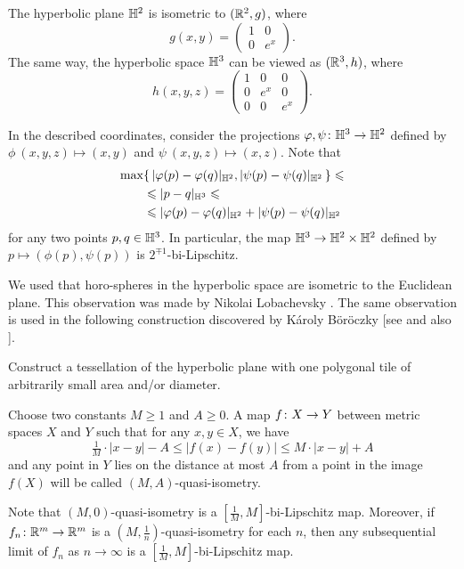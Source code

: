 The hyperbolic plane $\mathbb{H}^2$ is isometric to $(\mathbb{R}^2,g)$, where 
\[g(x,y)=\left(\begin{matrix}
     1&0
     \\
     0&e^{x}
    \end{matrix}\right).\]
The same way, the hyperbolic space $\mathbb{H}^3$
can be viewed as $(\mathbb{R}^3,h)$, where 
\[h(x,y,z)=\left(\begin{matrix}
     1&0&0
     \\
     0&e^{x}&0
     \\
     0&0&e^{x}
\end{matrix}\right).\]
    
In the described coordinates, consider the projections $\varphi,\psi\colon\mathbb{H}^3\to\mathbb{H}^2$ defined by 
$\phi\:(x,y,z)\mapsto (x,y)$ and $\psi\:(x,y,z)\mapsto (x,z)$.
Note that 
\begin{align*}
\max&\{\,|\varphi(p)-\varphi(q)|_{\mathbb{H}^2},|\psi(p)-\psi(q)|_{\mathbb{H}^2}\,\}
\leqslant
\\
&\leqslant
|p-q|_{\mathbb{H}^3}
\leqslant
\\
&\leqslant
|\varphi(p)-\varphi(q)|_{\mathbb{H}^2}+ |\psi(p)-\psi(q)|_{\mathbb{H}^2}
\end{align*}
for any two points $p,q\in \mathbb{H}^3$.
In particular, the map $\mathbb{H}^3\to\mathbb{H}^2\times\mathbb{H}^2$ defined by $p\mapsto (\phi(p),\psi(p))$
is $2^{\mp1}$-bi-Lipschitz.\qeds

We used that horo-spheres in the hyperbolic space are isometric to the Euclidean plane.
This observation was made by Nikolai Lobachevsky \cite[see 34 in][]{lobachevsky}.
The same observation is used in the following construction discovered by 
K\'{a}roly B\"{o}r\"{o}czky [see  and also ]. 

\begin{pr}
Construct a tessellation of the hyperbolic plane with one polygonal tile of arbitrarily small area and/or diameter.  
\end{pr}

Choose two constants $M\ge 1$ and $A\ge 0$.
A map $f\:X\z\to Y$ between metric spaces $X$ and $Y$ such that for any $x,y\in X$,
 we have
\[\tfrac1M\cdot |x-y|-A\le |f(x)-f(y)|\le M\cdot |x-y|+A\]
and any point in $Y$ lies on the distance at most $A$ from a point in the image $f(X)$
will be called $(M,A)$-quasi-isometry.

{\sloppy
Note that $(M,0)$-quasi-isometry is a $[\tfrac1M,M]$-bi-Lipschitz map.
Moreover,
if $f_n\colon\mathbb{R}^m\to\mathbb{R}^m$ is a  $(M,\frac1n)$-quasi-isometry 
for each $n$, 
then any subsequential limit of $f_n$ as $n\to\infty$
is a $[\tfrac1M,M]$-bi-Lipschitz map.

}

